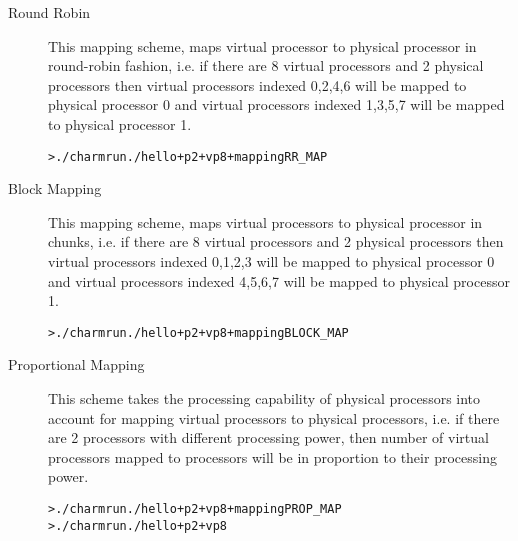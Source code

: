 \documentclass[10pt]{article}
\begin{document}
\begin{description}

\item[Round Robin]
                                                                                
This mapping scheme, maps virtual processor to physical processor in round-robin
fashion, i.e. if there are 8 virtual processors and 2 physical processors then
virtual processors indexed 0,2,4,6 will be mapped to physical processor 0 and 
virtual processors indexed 1,3,5,7 will be mapped to physical processor 1. 

\begin{alltt}
> ./charmrun ./hello +p2 +vp8 +mapping RR\_MAP
\end{alltt}
                                                                                
\item[Block Mapping]
                                                                                
This mapping scheme, maps virtual processors to physical processor in chunks, 
i.e. if there are 8 virtual processors and 2 physical processors then virtual 
processors indexed 0,1,2,3 will be mapped to physical processor 0 and virtual 
processors indexed 4,5,6,7 will be mapped to physical processor 1.
                                                                                
\begin{alltt}
> ./charmrun ./hello +p2 +vp8 +mapping BLOCK\_MAP
\end{alltt}
                                                                                
\item[Proportional Mapping]
                                                                                
This scheme takes the processing capability of physical processors into account
for mapping virtual processors to physical processors, i.e. if there are 2 
processors with different processing power, then number of virtual processors 
mapped to processors will be in proportion to their processing power.
                                                                                
\begin{alltt}
> ./charmrun ./hello +p2 +vp8 +mapping PROP\_MAP
> ./charmrun ./hello +p2 +vp8
\end{alltt}

\end{description}
\end{document}
